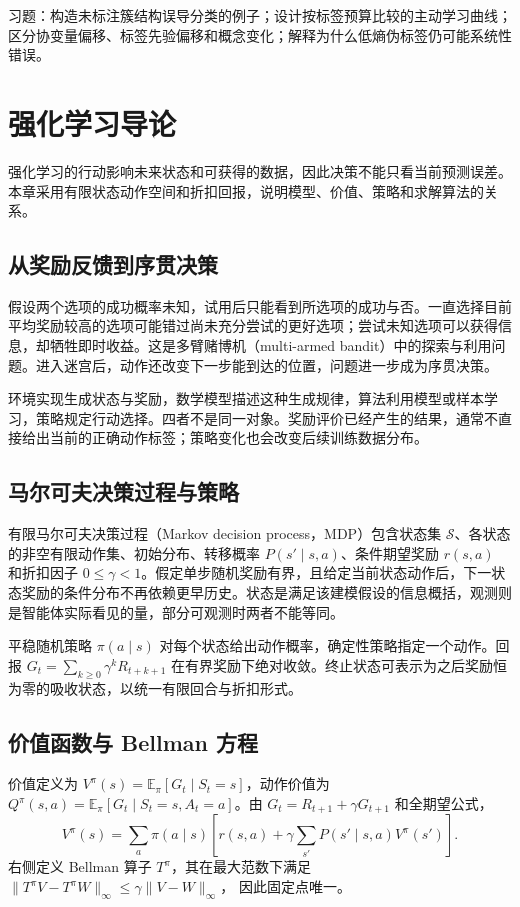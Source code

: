 \documentclass[UTF8,12pt,a4paper,fontset=fandol]{ctexbook}
\begin{document}
习题：构造未标注簇结构误导分类的例子；设计按标签预算比较的主动学习曲线；区分协变量偏移、标签先验偏移和概念变化；解释为什么低熵伪标签仍可能系统性错误。

\chapter{强化学习导论}
\label{chap:ml-rl}

强化学习的行动影响未来状态和可获得的数据，因此决策不能只看当前预测误差。本章采用有限状态动作空间和折扣回报，说明模型、价值、策略和求解算法的关系。

\section{从奖励反馈到序贯决策}

假设两个选项的成功概率未知，试用后只能看到所选项的成功与否。一直选择目前平均奖励较高的选项可能错过尚未充分尝试的更好选项；尝试未知选项可以获得信息，却牺牲即时收益。这是多臂赌博机（multi-armed bandit）中的探索与利用问题。进入迷宫后，动作还改变下一步能到达的位置，问题进一步成为序贯决策。

环境实现生成状态与奖励，数学模型描述这种生成规律，算法利用模型或样本学习，策略规定行动选择。四者不是同一对象。奖励评价已经产生的结果，通常不直接给出当前的正确动作标签；策略变化也会改变后续训练数据分布。

\section{马尔可夫决策过程与策略}

有限马尔可夫决策过程（Markov decision process，MDP）包含状态集 $\mathcal S$、各状态的非空有限动作集、初始分布、转移概率 $P(s'\mid s,a)$、条件期望奖励 $r(s,a)$ 和折扣因子 $0\leq\gamma<1$。假定单步随机奖励有界，且给定当前状态动作后，下一状态奖励的条件分布不再依赖更早历史。状态是满足该建模假设的信息概括，观测则是智能体实际看见的量，部分可观测时两者不能等同。

平稳随机策略 $\pi(a\mid s)$ 对每个状态给出动作概率，确定性策略指定一个动作。回报 $G_t=\sum_{k\geq0}\gamma^kR_{t+k+1}$ 在有界奖励下绝对收敛。终止状态可表示为之后奖励恒为零的吸收状态，以统一有限回合与折扣形式。

\section{价值函数与 Bellman 方程}

价值定义为 $V^\pi(s)=\mathbb E_\pi[G_t\mid S_t=s]$，动作价值为 $Q^\pi(s,a)=\mathbb E_\pi[G_t\mid S_t=s,A_t=a]$。由 $G_t=R_{t+1}+\gamma G_{t+1}$ 和全期望公式，
\begin{equation}
 V^\pi(s)=\sum_a\pi(a\mid s)\left[r(s,a)+\gamma\sum_{s'}P(s'\mid s,a)V^\pi(s')\right].
 \label{eq:ml-bellman-expectation}
\end{equation}
右侧定义 Bellman 算子 $T^\pi$，其在最大范数下满足
$\|T^\pi V-T^\pi W\|_\infty\leq\gamma\|V-W\|_\infty$，
因此固定点唯一。
\end{document}
